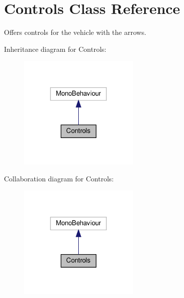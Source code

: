 \hypertarget{classControls}{}\section{Controls Class Reference}
\label{classControls}


Offers controls for the vehicle with the arrows.  




Inheritance diagram for Controls\+:\nopagebreak
\begin{figure}[H]
\begin{center}
\leavevmode
\includegraphics[width=164pt]{classControls__inherit__graph}
\end{center}
\end{figure}


Collaboration diagram for Controls\+:\nopagebreak
\begin{figure}[H]
\begin{center}
\leavevmode
\includegraphics[width=164pt]{classControls__coll__graph}
\end{center}
\end{figure}
